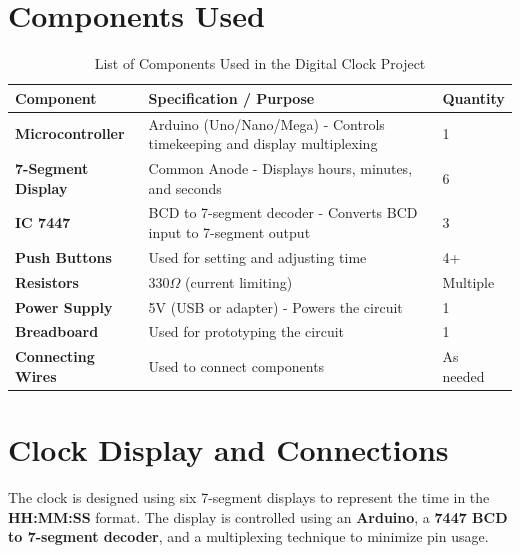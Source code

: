 \documentclass[journal]{IEEEtran}
\begin{document}
\section{Components Used}
\begin{table}[H]
    \centering
    \renewcommand{\arraystretch}{1.2} %
    \begin{tabular}{|p{4cm}|p{5cm}|p{2cm}|}
        \hline
        \textbf{Component} & \textbf{Specification / Purpose} & \textbf{Quantity} \\
        \hline
        \textbf{Microcontroller} & Arduino (Uno/Nano/Mega) - Controls timekeeping and display multiplexing & 1 \\
        \hline
        \textbf{7-Segment Display} & Common Anode - Displays hours, minutes, and seconds & 6 \\
        \hline
        \textbf{IC 7447} & BCD to 7-segment decoder - Converts BCD input to 7-segment output & 3 \\
        \hline
        \textbf{Push Buttons} & Used for setting and adjusting time & 4+ \\
        \hline
        \textbf{Resistors} &  330$\Omega$ (current limiting) & Multiple \\
        \hline
        \textbf{Power Supply} & 5V (USB or adapter) - Powers the circuit & 1 \\
        \hline
        \textbf{Breadboard} & Used for prototyping the circuit & 1 \\
        \hline
        \textbf{Connecting Wires} & Used to connect components & As needed \\
        \hline
    \end{tabular}
    \caption{List of Components Used in the Digital Clock Project}
    \label{tab:components}
\end{table}

\section{Clock Display and Connections}

The clock is designed using six 7-segment displays to represent the time in the \textbf{HH:MM:SS} format. The display is controlled using an \textbf{Arduino}, a \textbf{7447 BCD to 7-segment decoder}, and a multiplexing technique to minimize pin usage.
\end{document}
